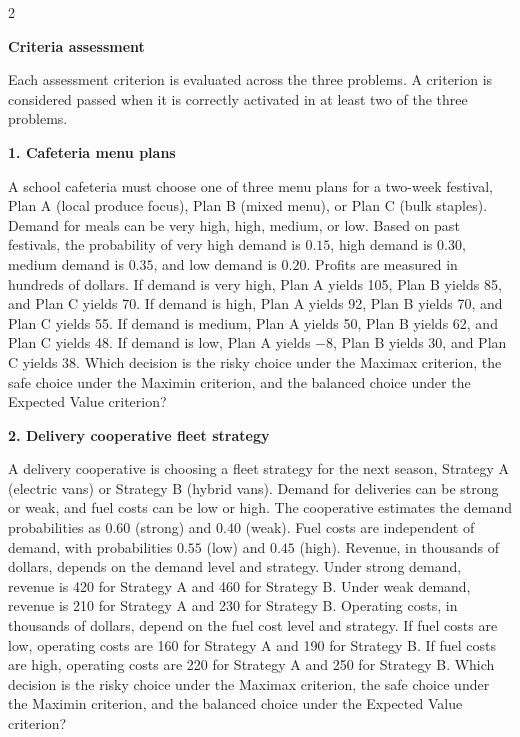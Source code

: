 \documentclass[12pt]{article}
\newcommand{\SubsectionBox}[1]{%
	\noindent\colorbox{gray!30}{%
		\parbox{\linewidth}{\textbf{#1}}%
	}\par\vspace{0.35cm}%
}
\begin{document}
	\begin{multicols}{2}
		\SubsectionBox{Criteria assessment}\vspace{-0.25cm}
		Each assessment criterion is evaluated across the three problems. A criterion is considered passed when it is correctly activated in at least two of the three problems.
		
		\vspace{0.25cm}
		\SubsectionBox{1. Cafeteria menu plans}\vspace{-0.25cm}
		A school cafeteria must choose one of three menu plans for a two-week festival, Plan A (local produce focus),
		Plan B (mixed menu), or Plan C (bulk staples). Demand for meals can be very high, high, medium, or low. Based on past festivals, the probability of very high demand is $0.15$, high demand is $0.30$, medium demand is $0.35$, and low demand is $0.20$. Profits are measured in hundreds of dollars. If demand is very high, Plan A yields 105, Plan B yields 85, and Plan C yields 70. If demand is high, Plan A yields 92, Plan B yields 70, and Plan C yields 55. If demand is medium, Plan A yields 50, Plan B yields 62, and Plan C yields 48. If demand is low, Plan A yields $-8$, Plan B yields 30, and Plan C yields 38. Which decision is the risky choice under the Maximax criterion, the safe choice under the Maximin criterion, and the balanced choice under the Expected Value criterion?

		\vspace{0.25cm}
		\SubsectionBox{2. Delivery cooperative fleet strategy}\vspace{-0.25cm}
		A delivery cooperative is choosing a fleet strategy for the next season, Strategy A (electric vans)
		or Strategy B (hybrid vans). Demand for deliveries can be strong or weak, and fuel costs can be low or high. The cooperative estimates the demand probabilities as $0.60$ (strong) and $0.40$ (weak). Fuel costs are independent of demand, with probabilities $0.55$ (low) and $0.45$ (high). Revenue, in thousands of dollars, depends on the demand level and strategy. Under strong demand, revenue is 420 for Strategy A and 460 for Strategy B. Under weak demand, revenue is 210 for Strategy A and 230 for Strategy B. Operating costs, in thousands of dollars, depend on the fuel cost level and strategy. If fuel costs are low, operating costs are 160 for Strategy A and 190 for Strategy B. If fuel costs are high, operating costs are 220 for Strategy A and 250 for Strategy B. Which decision is the risky choice under the Maximax criterion, the safe choice under the Maximin criterion, and the balanced choice under the Expected Value criterion?
		

\end{multicols}
\end{document}
